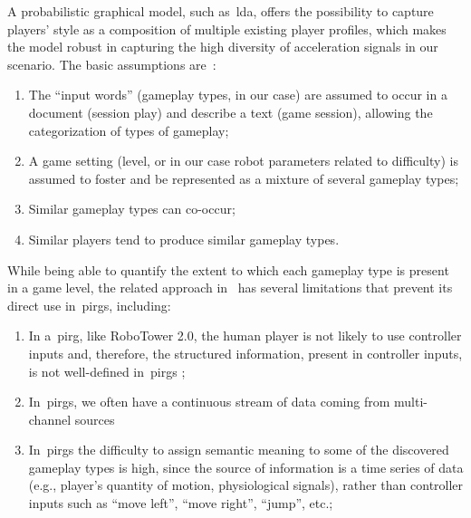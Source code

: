 

A probabilistic graphical model, such as~\gls{lda}, offers the possibility to capture players' style as a composition of multiple existing player profiles, which makes the model robust in capturing the high diversity of acceleration signals in our scenario. The basic assumptions are~\citep{smith_mining_2016}:

\begin{enumerate}[label=\Alph*.]
\item The ``input words'' (gameplay types, in our case) are assumed to occur in a document (session play) and describe a text (game session), allowing the categorization of types of gameplay;
\item A game setting (level, or in our case robot parameters related to difficulty) is assumed to foster and be represented as a mixture of several gameplay types;
\item Similar gameplay types can co-occur;
\item Similar players tend to produce similar gameplay types.
\end{enumerate}

While being able to quantify the extent to which each gameplay type is present in a game level, the related approach in~\cite{smith_mining_2016} has several limitations that prevent its direct use in~\gls{pirg}s, including:

\begin{enumerate}[label=\Roman*.]
    \item In a~\gls{pirg}, like RoboTower 2.0, the human player is not likely to use controller inputs and, therefore, the structured information, present in controller inputs, is not well-defined in~\gls{pirg}s ;
    \item In~\gls{pirg}s, we often have a continuous stream of data coming from multi-channel sources %
    \item In~\gls{pirg}s the difficulty to assign semantic meaning to some of the discovered gameplay types is high, since the source of information is a time series of data (e.g., player's quantity of motion, physiological signals), rather than controller inputs such as ``move left'', ``move right'', ``jump'', etc.;

\end{enumerate}

